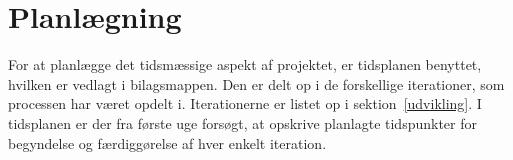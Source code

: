 \chapter{Planlægning}
For at planlægge det tidsmæssige aspekt af projektet, er tidsplanen benyttet, hvilken er vedlagt i bilagsmappen. Den er delt op i de forskellige iterationer, som processen har været opdelt i. Iterationerne er listet op i sektion~\ref{udvikling}. I tidsplanen er der fra første uge forsøgt, at opskrive planlagte tidspunkter for begyndelse og færdiggørelse af hver enkelt iteration. 